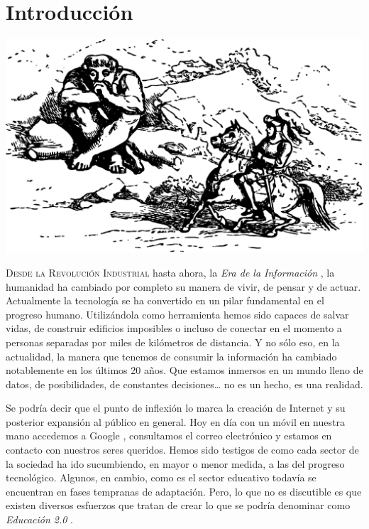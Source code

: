 \chapter{Introducción} 
\label{chapter:introduccion}
\label{section:introduccion}
\glsresetall

\begin{center}
\includegraphics[scale=0.4]{../graphics/johnny_automatic_Jack_and_the_giant.eps}
\end{center}

\lettrine{D}{esde la Revolución Industrial} hasta ahora, la \textit{Era de la Información} \cite{web:informationage}, la humanidad ha cambiado por completo su manera de vivir, de pensar y de actuar. Actualmente la tecnología se ha convertido en un pilar fundamental en el progreso humano. Utilizándola como herramienta hemos sido capaces de salvar vidas, de construir edificios imposibles o incluso de conectar en el momento a personas separadas por miles de kilómetros de distancia. Y no sólo eso, en la actualidad, la manera que tenemos de consumir la información ha cambiado notablemente en los últimos 20 años. Que estamos inmersos en un mundo lleno de datos, de posibilidades, de constantes decisiones\ldots{} no es un hecho, es una realidad.

Se podría decir que el punto de inflexión lo marca la creación de Internet y su posterior expansión al público en general. Hoy en día con un móvil en nuestra mano accedemos a Google \cite{web:google}, consultamos el correo electrónico y estamos en contacto con nuestros seres queridos. Hemos sido testigos de como cada sector de la sociedad ha ido sucumbiendo, en mayor o menor medida, a las  del progreso tecnológico. Algunos, en cambio, como es el sector educativo todavía se encuentran en fases tempranas de adaptación. Pero, lo que no es discutible es que existen diversos esfuerzos que tratan de crear lo que se podría denominar como \textit{Educación 2.0} \cite{web:educacion20}.

